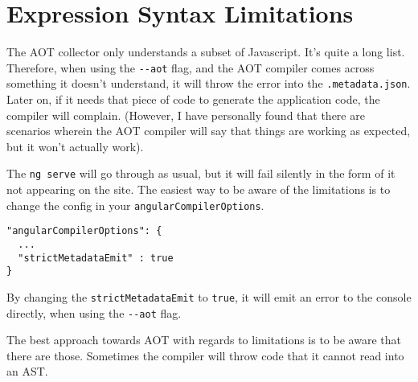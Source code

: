 \section{Expression Syntax Limitations}
The AOT collector only understands a subset of Javascript. It's quite a long 
list. Therefore, when using the \lstinline{--aot} flag, and the AOT compiler 
comes across something it doesn't understand, it will throw the error into 
the \lstinline{.metadata.json}. Later on, if it needs that piece of code 
to generate the application code, the compiler will complain. (However, I have 
personally found that there are scenarios wherein the AOT compiler will say
that things are working as expected, but it won't actually work). 

The \lstinline{ng serve} will go through as usual, but it will fail silently 
in the form of it not appearing on the site. The easiest way to be aware of
the limitations is to change the config in your \lstinline{angularCompilerOptions}. 

\begin{lstlisting}
"angularCompilerOptions": {
  ...
  "strictMetadataEmit" : true
}  
\end{lstlisting}

By changing the \lstinline{strictMetadataEmit} to \lstinline{true}, it will
emit an error to the console directly, when using the \lstinline{--aot} flag.

The best approach towards AOT with regards to limitations is to be aware that 
there are those. Sometimes the compiler will throw code that it cannot read 
into an AST. 
